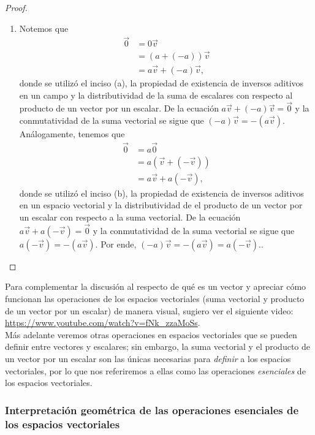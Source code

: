\documentclass[notasLineal]{subfiles}
\begin{document}
\begin{proof}
\begin{enumerate}[label=(\alph*)]
        \item Notemos que
            \begin{align*}
                \vec{0} &= 0\vec{v} \\
                           &= (a+(-a)) \vec{v} \\
                           &= a\vec{v} + (-a)\vec{v},
            \end{align*}
            donde se utilizó el inciso (a), la propiedad de existencia de inversos aditivos en un campo y la distributividad de la suma de escalares con respecto al producto de un vector por un escalar. De la ecuación $a\vec{v} + (-a)\vec{v} = \vec{0}$ y la conmutatividad de la suma vectorial se sigue que $(-a)\vec{v} = -(a\vec{v})$. Análogamente, tenemos que
            \begin{align*}
                \vec{0} &= a\vec{0} \\
                           &= a(\vec{v} + (-\vec{v})) \\
                           &= a\vec{v} + a(-\vec{v}),
            \end{align*}
            donde se utilizó el inciso (b), la propiedad de existencia de inversos aditivos en un espacio vectorial y la distributividad de el producto de un vector por un escalar con respecto a la suma vectorial. De la ecuación $a\vec{v}+a(-\vec{v}) = \vec{0}$ y la conmutatividad de la suma vectorial se sigue que $a(-\vec{v}) = -(a\vec{v})$. Por ende, $(-a)\vec{v} = -(a\vec{v}) = a(-\vec{v})$..

    \end{enumerate}
\end{proof}

Para complementar la discusión al respecto de qué es un vector y apreciar cómo funcionan las operaciones de los espacios vectoriales (suma vectorial y producto de un vector por un escalar) de manera visual, sugiero ver el siguiente video: \url{https://www.youtube.com/watch?v=fNk_zzaMoSs}. \\

Más adelante veremos otras operaciones en espacios vectoriales que se pueden definir entre vectores y escalares; sin embargo, la suma vectorial y el producto de un vector por un escalar son las únicas necesarias para \emph{definir} a los espacios vectoriales, por lo que nos referiremos a ellas como las operaciones \emph{esenciales} de los espacios vectoriales.

\subsubsection*{Interpretación geométrica de las operaciones esenciales de los espacios vectoriales} \label{Sssec:Interpretación geométrica de las operaciones de los espacios vectoriales}
\end{document}
